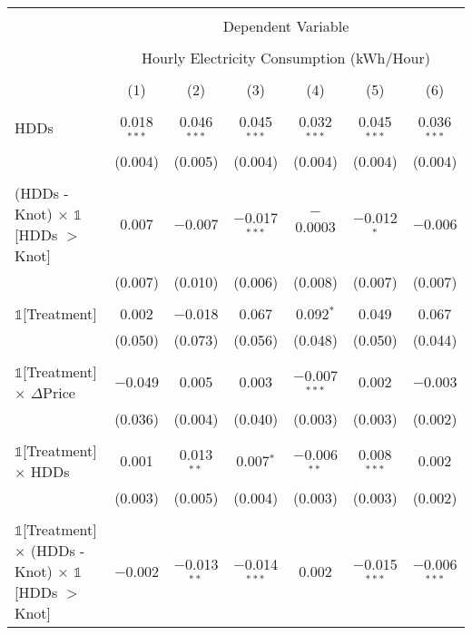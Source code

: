 
\begin{table}[!htbp] \centering 
  \label{Table:Breakdown-of-Average-Treatement-Effects-in-the-Peak-Rate-Period_As-a-Function-of-Rate-Changes} 
\scriptsize
\begin{longtable}{@{\extracolsep{15pt}}lcccccc} 
\\[-1.8ex]\hline 
\hline \\[-1.8ex] 
 & \multicolumn{6}{c}{Dependent Variable} \\ 
\cline{2-7} 
\\[-1.8ex] & \multicolumn{6}{c}{Hourly Electricity Consumption  (kWh/Hour)} \\ 
\\[-1.8ex] & (1) & (2) & (3) & (4) & (5) & (6)\\ 
\hline \\[-1.8ex] \endhead
 HDDs & 0.018$^{***}$ & 0.046$^{***}$ & 0.045$^{***}$ & 0.032$^{***}$ & 0.045$^{***}$ & 0.036$^{***}$ \\ 
  & (0.004) & (0.005) & (0.004) & (0.004) & (0.004) & (0.004) \\ 
  & & & & & & \\ 
 (HDDs - Knot) $\times$ $\mathbb{1}$[HDDs $>$ Knot] & 0.007 & $-$0.007 & $-$0.017$^{***}$ & $-$0.0003 & $-$0.012$^{*}$ & $-$0.006 \\ 
  & (0.007) & (0.010) & (0.006) & (0.008) & (0.007) & (0.007) \\ 
  & & & & & & \\ 
 $\mathbb{1}$[Treatment] & 0.002 & $-$0.018 & 0.067 & 0.092$^{*}$ & 0.049 & 0.067 \\ 
  & (0.050) & (0.073) & (0.056) & (0.048) & (0.050) & (0.044) \\ 
  & & & & & & \\ 
 $\mathbb{1}$[Treatment] $\times$ $\Delta$Price & $-$0.049 & 0.005 & 0.003 & $-$0.007$^{***}$ & 0.002 & $-$0.003 \\ 
  & (0.036) & (0.004) & (0.040) & (0.003) & (0.003) & (0.002) \\ 
  & & & & & & \\ 
 $\mathbb{1}$[Treatment] $\times$ HDDs & 0.001 & 0.013$^{**}$ & 0.007$^{*}$ & $-$0.006$^{**}$ & 0.008$^{***}$ & 0.002 \\ 
  & (0.003) & (0.005) & (0.004) & (0.003) & (0.003) & (0.002) \\ 
  & & & & & & \\ 
 $\mathbb{1}$[Treatment] $\times$ (HDDs - Knot) $\times$ $\mathbb{1}$[HDDs $>$ Knot] & $-$0.002 & $-$0.013$^{**}$ & $-$0.014$^{***}$ & 0.002 & $-$0.015$^{***}$ & $-$0.006$^{***}$ \\ 

\end{longtable}
\end{table}

